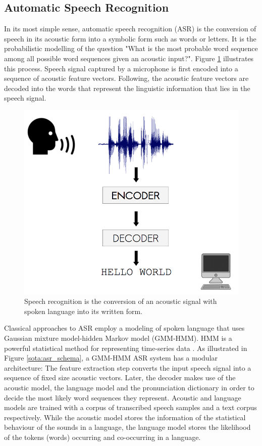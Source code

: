 
\subsection{Automatic Speech Recognition}
\label{sota:asr}

In its most simple sense, automatic speech recognition (ASR) is the conversion of speech in its acoustic form into a symbolic form such as words or letters. It is the probabilistic modelling of the question "What is the most probable word sequence among all possible word sequences given an acoustic input?". Figure \ref{sota:asr_process} illustrates this process. Speech signal captured by a microphone is first encoded into a sequence of acoustic feature vectors. Following, the acoustic feature vectors are decoded into the words that represent the linguistic information that lies in the speech signal. 

\begin{figure}[t]
  \centering
  \includegraphics[width=0.5\linewidth]{img/asr_schema.png}
  \caption[Speech recognition.]{Speech recognition is the conversion of an acoustic signal with spoken language into its written form. }
  \label{sota:asr_process}
\end{figure}

Classical approaches to ASR employ a modeling of spoken language that uses Gaussian mixture model-hidden Markov model (GMM-HMM). HMM is a powerful statistical method for representing time-series data \citep{slp_book, hmm_balls}. As illustrated in Figure \ref{sota:asr_schema}, a GMM-HMM ASR system has a modular architecture: The feature extraction step converts the input speech signal into a sequence of fixed size acoustic vectors. Later, the decoder makes use of the acoustic model, the language model and the pronunciation dictionary in order to decide the most likely word sequences they represent. Acoustic and language models are trained with a corpus of transcribed speech samples and a text corpus respectively. While the acoustic model stores the information of the statistical behaviour of the sounds in a language, the language model stores the likelihood of the tokens (words) occurring and co-occurring in a language. 

